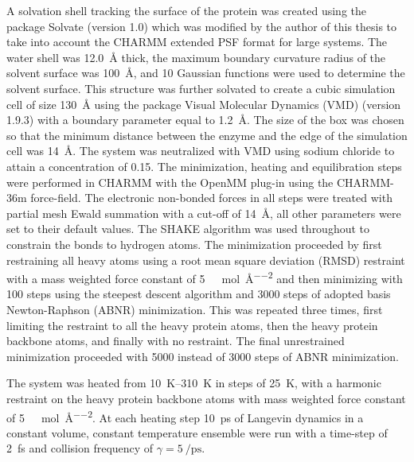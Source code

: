 A solvation shell tracking the surface of the protein was created using the package Solvate (version 1.0) \cite{grubmullerSolvate} which was modified by the author of this thesis to take into account the CHARMM extended PSF format for large systems. The water shell was \SI{12.0}{\angstrom} thick, the maximum boundary curvature radius of the solvent surface was \SI{100}{\angstrom}, and \num{10} Gaussian functions were used to determine the solvent surface. This structure was further solvated to create a cubic simulation cell of size \SI{130}{\angstrom} using the package Visual Molecular Dynamics (VMD) (version 1.9.3) \cite{HUMP96} with a boundary parameter equal to \SI{1.2}{\angstrom}. The size of the box was chosen so that the minimum distance between the enzyme and the edge of the simulation cell was  \SI{14}{\angstrom}. The system was neutralized with VMD using sodium chloride to attain a concentration of \SI{0.15}{\molar}. 
The minimization, heating and equilibration steps were performed in CHARMM with the OpenMM \cite{eastmanOpenMMRapidDevelopment2017} plug-in using the CHARMM-36m \cite{huangCHARMM36AllatomAdditive2013} force-field. The electronic non-bonded forces in all steps were treated with partial mesh Ewald summation \cite{dardenParticleMeshEwald1993} with a cut-off of \SI{14}{\angstrom}, all other parameters were set to their default values. The SHAKE \cite{ryckaertNumericalIntegrationCartesian1977b} algorithm was used throughout to constrain the bonds to hydrogen atoms. The minimization proceeded by first restraining all heavy atoms  using a root mean square deviation (RMSD) restraint with a mass weighted force constant of \SI{5}{\kilo\cal\per\mol\per\square\angstrom} and then minimizing with \num{100} steps using the steepest descent algorithm and \num{3000} steps of adopted basis Newton-Raphson (ABNR) minimization. This was repeated three times, first limiting the  restraint to all the heavy protein atoms, then the heavy protein backbone atoms, and finally with no restraint. The final unrestrained minimization proceeded with \num{5000} instead of \num{3000} steps of ABNR minimization. 

The system was heated from \SIrange{10}{310}{\kelvin} in steps of \SI{25}{\kelvin}, with a harmonic restraint on the heavy protein backbone atoms with mass weighted force constant of \SI{5}{\kilo\cal\per\mol\per\square\angstrom}. At each heating step \SI{10}{\pico\second} of Langevin dynamics \cite{ermakComputerSimulationCharged1974,ermakEquilibriumElectrostaticEffects1974} in a constant volume, constant temperature ensemble were run with a time-step of \SI{2}{\femto\second} and collision frequency of $\gamma=\SI{5}{\per\pico\second}$. 

